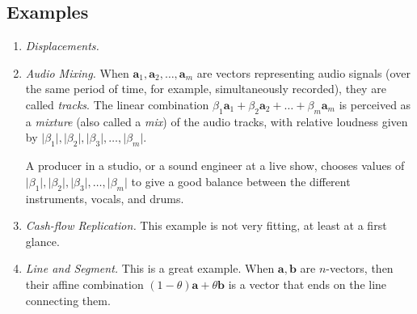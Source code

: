 \documentclass[11pt]{book}
\theoremstyle{definition}
\theoremstyle{plain}
\theoremstyle{problemstyle}
\theoremstyle{remark}
\theoremstyle{definition}
\begin{document}
\subsection*{Examples}
\begin{enumerate}
\item\emph{Displacements.} 
\item\emph{Audio Mixing.} When $\boldsymbol{a}_1,\boldsymbol{a}_2,\dots,\boldsymbol{a}_m$ are vectors representing audio signals (over the same period of time, for example, simultaneously recorded), they are called \emph{tracks}. The linear combination $\beta_1\boldsymbol{a}_1+\beta_2\boldsymbol{a}_2+\dots+\beta_m\boldsymbol{a}_m$ is perceived as a \emph{mixture} (also called a \emph{mix}) of the audio tracks, with relative loudness given by $\lvert\beta_1\rvert,\lvert\beta_2\rvert,\lvert\beta_3\rvert,\dots,\lvert\beta_m\rvert$. 

    A producer in a studio, or a sound engineer at a live show, chooses values of $\lvert\beta_1\rvert,\lvert\beta_2\rvert,\lvert\beta_3\rvert,\dots,\lvert\beta_m\rvert$ to give a good balance between the different
instruments, vocals, and drums.

\item\emph{Cash-flow Replication.} This example is not very fitting, at least at a first glance.
\item\emph{Line and Segment.} This is a great example. When $\boldsymbol{a,b}$ are $n$-vectors, then their affine combination $(1-\theta)\boldsymbol{a}+\theta\boldsymbol{b}$ is a vector that ends on the line connecting them.
\end{enumerate}
\end{document}
